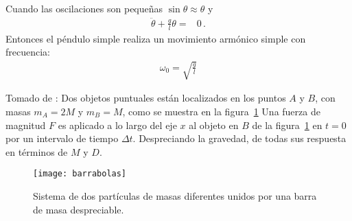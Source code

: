 Cuando las oscilaciones son pequeñas $\sin\theta\approx\theta$ y
\begin{align}
   \ddot\theta+ \frac{g}{l}\theta=&0\,.
\end{align}
Entonces el péndulo simple realiza un movimiento armónico simple con frecuencia:
\begin{align}
  \omega_0=\sqrt{\frac{g}{l}}
\end{align}

\ejemplo{}
Tomado de \cite{mit2009}: Dos objetos puntuales están localizados en los puntos $A$ y $B$, con masas $m_A=2M$ y $m_B=M$, como se muestra en la figura~\ref{fig:barrabolas} Una fuerza de magnitud $F$ es aplicado a lo largo del eje $x$ al objeto en $B$ de la figura~\ref{fig:barrabolas} en $t=0$ por un intervalo de tiempo $\Delta t$. Despreciando la gravedad, de todas sus respuesta en términos de $M$ y $D$.
  \begin{figure}
    \centering
    \texttt{[image: barrabolas]}
    \caption{Sistema de dos partículas de masas diferentes unidos por una barra de masa despreciable.}
    \label{fig:barrabolas}
  \end{figure}

